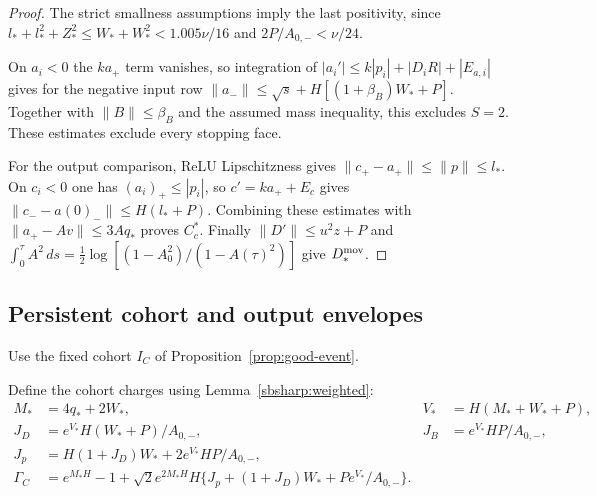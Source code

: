 \documentclass[10pt]{article}
\theoremstyle{remark}\newtheorem{remark}[theorem]{Remark}
\begin{document}
\begin{proof}
The strict smallness assumptions imply the last positivity, since
$l_*+l_*^2+Z_*^2\le W_*+W_*^2<1.005\nu/16$
and $2P/A_{0,-}<\nu/24$.

On $a_i<0$ the $ka_+$ term vanishes, so integration of
$|a_i'|\le k|p_i|+|D_iR|+|E_{a,i}|$ gives
for the negative input row
$\|a_-\|\le\sqrt s+H[(1+\beta_B)W_*+P]$.
Together with $\|B\|\le\beta_B$ and the assumed mass inequality,
this excludes $S=2$. These estimates exclude every stopping face.

For the output comparison, ReLU Lipschitzness gives
$\|c_+-a_+\|\le\|p\|\le l_*$. On $c_i<0$ one has
$(a_i)_+\le|p_i|$, so $c'=ka_++E_c$ gives
$\|c_--a(0)_-\|\le H(l_*+P)$.
Combining these estimates with $\|a_+-Av\|\le3Aq_*$ proves $C_c^*$. 
Finally $\|D'\|\le u^2z+P$ and
$\int_0^\tau A^2\,ds=\frac12\log[(1-A_0^2)/(1-A(\tau)^2)]$
give $D_*^{\rm mov}$. 
\end{proof}

\subsection{Persistent cohort and output envelopes}

Use the fixed cohort $I_C$ of Proposition~\ref{prop:good-event}.

Define the cohort charges using Lemma~\ref{sbsharp:weighted}:
\begin{align*}
 M_*&=4q_*+2W_*,& V_*&=H(M_*+W_*+P),\\
 J_D&=e^{V_*}H(W_*+P)/A_{0,-},&
 J_B&=e^{V_*}HP/A_{0,-},\\
 J_p&=H(1+J_D)W_*+2e^{V_*}HP/A_{0,-},\\
 \Gamma_C&=e^{M_*H}-1+
 \sqrt2e^{2M_*H}H\{J_p+(1+J_D)W_*+Pe^{V_*}/A_{0,-}\}.
\end{align*}
\end{document}
